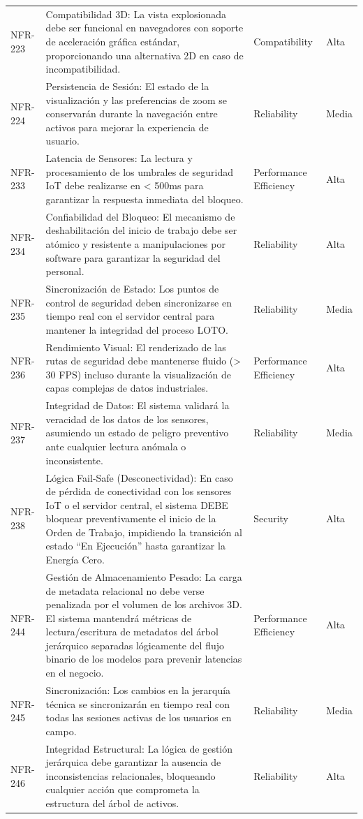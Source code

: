 \begin{longtable}{>{\raggedright\arraybackslash}p{} >{\raggedright\arraybackslash}p{} >{\raggedright\arraybackslash}p{} >{\raggedright\arraybackslash}p{}}
NFR-223 & Compatibilidad 3D: La vista explosionada debe ser funcional en navegadores con soporte de aceleración gráfica estándar, proporcionando una alternativa 2D en caso de incompatibilidad. & Compatibility & Alta \\
NFR-224 & Persistencia de Sesión: El estado de la visualización y las preferencias de zoom se conservarán durante la navegación entre activos para mejorar la experiencia de usuario. & Reliability & Media \\
NFR-233 & Latencia de Sensores: La lectura y procesamiento de los umbrales de seguridad IoT debe realizarse en < 500ms para garantizar la respuesta inmediata del bloqueo. & Performance Efficiency & Alta \\
NFR-234 & Confiabilidad del Bloqueo: El mecanismo de deshabilitación del inicio de trabajo debe ser atómico y resistente a manipulaciones por software para garantizar la seguridad del personal. & Reliability & Alta \\
NFR-235 & Sincronización de Estado: Los puntos de control de seguridad deben sincronizarse en tiempo real con el servidor central para mantener la integridad del proceso LOTO. & Reliability & Media \\
NFR-236 & Rendimiento Visual: El renderizado de las rutas de seguridad debe mantenerse fluido (> 30 FPS) incluso durante la visualización de capas complejas de datos industriales. & Performance Efficiency & Alta \\
NFR-237 & Integridad de Datos: El sistema validará la veracidad de los datos de los sensores, asumiendo un estado de peligro preventivo ante cualquier lectura anómala o inconsistente. & Reliability & Media \\
NFR-238 & Lógica Fail-Safe (Desconectividad): En caso de pérdida de conectividad con los sensores IoT o el servidor central, el sistema DEBE bloquear preventivamente el inicio de la Orden de Trabajo, impidiendo la transición al estado ``En Ejecución'' hasta garantizar la Energía Cero. & Security & Alta \\
NFR-244 & Gestión de Almacenamiento Pesado: La carga de metadata relacional no debe verse penalizada por el volumen de los archivos 3D. El sistema mantendrá métricas de lectura/escritura de metadatos del árbol jerárquico separadas lógicamente del flujo binario de los modelos para prevenir latencias en el negocio. & Performance Efficiency & Alta \\
NFR-245 & Sincronización: Los cambios en la jerarquía técnica se sincronizarán en tiempo real con todas las sesiones activas de los usuarios en campo. & Reliability & Media \\
NFR-246 & Integridad Estructural: La lógica de gestión jerárquica debe garantizar la ausencia de inconsistencias relacionales, bloqueando cualquier acción que comprometa la estructura del árbol de activos. & Reliability & Alta \\
\bottomrule
\end{longtable}
\normalsize